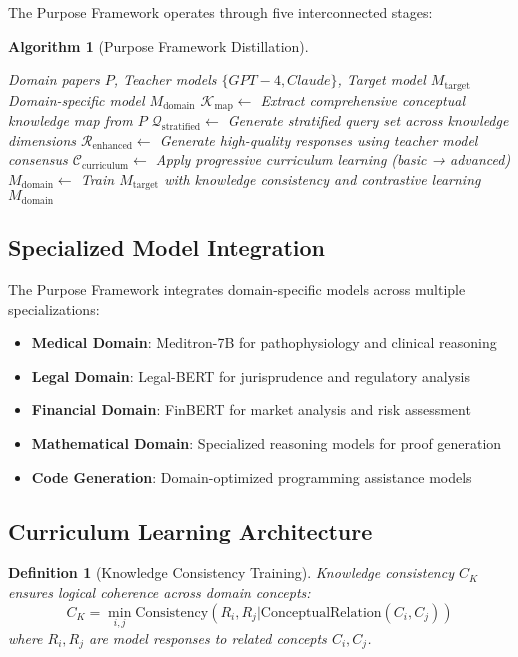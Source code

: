 \documentclass[12pt,a4paper]{article}
\newtheorem{definition}[theorem]{Definition}
\newtheorem{algorithm}[theorem]{Algorithm}
\begin{document}
The Purpose Framework operates through five interconnected stages:

\begin{algorithm}[Purpose Framework Distillation]
\begin{algorithmic}[1]
\REQUIRE Domain papers $P$, Teacher models $\{GPT-4, Claude\}$, Target model $M_{\text{target}}$
\ENSURE Domain-specific model $M_{\text{domain}}$
\STATE $\mathcal{K}_{\text{map}} \leftarrow$ Extract comprehensive conceptual knowledge map from $P$
\STATE $\mathcal{Q}_{\text{stratified}} \leftarrow$ Generate stratified query set across knowledge dimensions
\STATE $\mathcal{R}_{\text{enhanced}} \leftarrow$ Generate high-quality responses using teacher model consensus
\STATE $\mathcal{C}_{\text{curriculum}} \leftarrow$ Apply progressive curriculum learning (basic → advanced)
\STATE $M_{\text{domain}} \leftarrow$ Train $M_{\text{target}}$ with knowledge consistency and contrastive learning
\RETURN $M_{\text{domain}}$
\end{algorithmic}
\end{algorithm}

\subsection{Specialized Model Integration}

The Purpose Framework integrates domain-specific models across multiple specializations:

\begin{itemize}
\item \textbf{Medical Domain}: Meditron-7B for pathophysiology and clinical reasoning
\item \textbf{Legal Domain}: Legal-BERT for jurisprudence and regulatory analysis  
\item \textbf{Financial Domain}: FinBERT for market analysis and risk assessment
\item \textbf{Mathematical Domain}: Specialized reasoning models for proof generation
\item \textbf{Code Generation}: Domain-optimized programming assistance models
\end{itemize}

\subsection{Curriculum Learning Architecture}

\begin{definition}[Knowledge Consistency Training]
Knowledge consistency $C_K$ ensures logical coherence across domain concepts:
\begin{equation}
C_K = \min_{i,j} \text{Consistency}(R_i, R_j | \text{ConceptualRelation}(C_i, C_j))
\end{equation}
where $R_i, R_j$ are model responses to related concepts $C_i, C_j$.
\end{definition}
\end{document}
